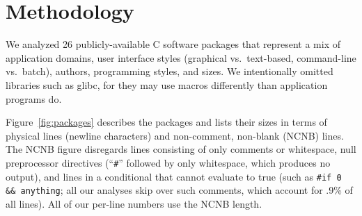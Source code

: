 \documentclass[10pt]{article}
\def\numpackages{26}
\newcommand{\pkg}[1]{\textsf{#1}}
\begin{document}
%

%






\section{Methodology}
\label{sec:methodology}


We analyzed {\numpackages} publicly-available C software packages that
represent a mix of application domains, user interface styles (graphical vs.\ 
text-based, command-line vs.\ batch), authors, programming styles, and
sizes.  We intentionally omitted libraries such as \pkg{glibc}, for they
may use macros differently than application programs do.

Figure~\ref{fig:packages} describes the packages and lists their sizes in
terms of physical lines (newline characters) and non-comment, non-blank
(NCNB) lines.  The NCNB figure disregards lines consisting of only comments
or whitespace, null preprocessor directives (``{\tt \#}'' followed by only
whitespace, which produces no output), and lines in a conditional that
cannot evaluate to true (such as {\tt \#if 0 \&\& anything}; all our
analyses skip over such comments, which account for .9\% of all lines).
All of our per-line numbers use the NCNB length.
\end{document}
